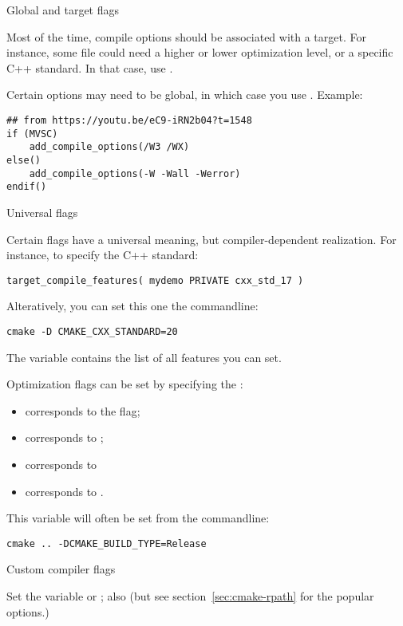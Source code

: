  {Global and target flags}

Most of the time, compile options should be associated with a target.
For instance, some file could need a higher or lower optimization level,
or a specific C++ standard.
In that case, use .

Certain options may need to be global, in which case you use
. Example:
\begin{lstlisting}
## from https://youtu.be/eC9-iRN2b04?t=1548
if (MVSC)
    add_compile_options(/W3 /WX)
else()
    add_compile_options(-W -Wall -Werror)
endif()
\end{lstlisting}

 {Universal flags}

Certain flags have a universal meaning, but compiler-dependent realization.
For instance, to specify the C++ standard:
\begin{lstlisting}
target_compile_features( mydemo PRIVATE cxx_std_17 )
\end{lstlisting}
Alteratively, you can set this one the commandline:
\begingroup\lstset{language=Bash}
\begin{lstlisting}
cmake -D CMAKE_CXX_STANDARD=20
\end{lstlisting}
\endgroup
The variable 
contains the list of all features you can set.

Optimization flags can be set by specifying the :
\begin{itemize}
\item 
     corresponds to the  flag;
\item
     corresponds to ;
\item
     corresponds to 
\item 
     corresponds to .
\end{itemize}
This variable will often be set from the commandline:
\begin{verbatim}
cmake .. -DCMAKE_BUILD_TYPE=Release
\end{verbatim}

 {Custom compiler flags}

Set the variable
or
;
also
(but see section~\ref{sec:cmake-rpath}
for the popular  options.)

